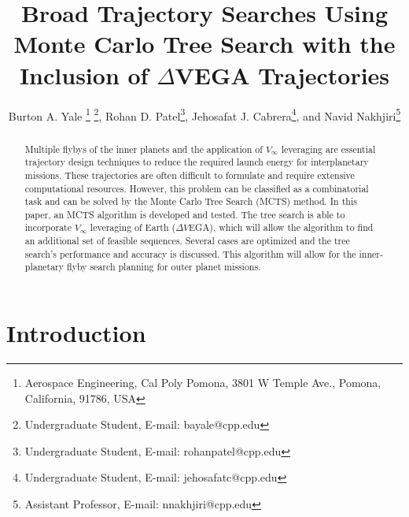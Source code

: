 \documentclass[letterpaper, preprint, paper,11pt]{AAS}	%
\begin{document}
\title{Broad Trajectory Searches Using Monte Carlo Tree Search with the Inclusion of $\Delta$VEGA Trajectories}

\author{
    Burton A. Yale
        \thanks{Aerospace Engineering, Cal Poly Pomona, 3801 W Temple Ave., Pomona, California, 91786, USA}
        \thanks{Undergraduate Student, E-mail: bayale@cpp.edu},
    Rohan D. Patel\footnotemark[1]
        \thanks{Undergraduate Student, E-mail: rohanpatel@cpp.edu},
    Jehosafat J. Cabrera\footnotemark[1]
        \thanks{Undergraduate Student, E-mail: jehosafatc@cpp.edu},
    and Navid Nakhjiri\footnotemark[1]
        \thanks{Assistant Professor, E-mail: nnakhjiri@cpp.edu}
}

\maketitle{}

\begin{abstract}
Multiple flybys of the inner planets and the application of $V_{\infty}$ leveraging are essential trajectory design techniques to reduce the required launch energy for interplanetary missions. These trajectories are often difficult to formulate and require extensive computational resources. However, this problem can be classified as a combinatorial task and can be solved by the Monte Carlo Tree Search (MCTS) method. In this paper, an MCTS algorithm is developed and tested. The tree search is able to incorporate $V_\infty$ leveraging of Earth ($\Delta V$EGA), which will allow the algorithm to find an additional set of feasible sequences. Several cases are optimized and the tree search's performance and accuracy is discussed. This algorithm will allow for the inner-planetary flyby search planning for outer planet missions.
\end{abstract}

\section*{Introduction}
\end{document}
